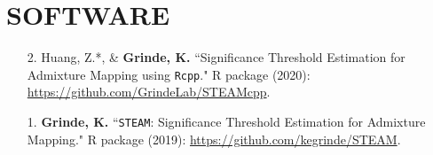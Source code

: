 \documentclass[margin]{res}
\begin{document}
\begin{resume}
\begin{itemize}
\end{itemize}


\section{SOFTWARE} 

\begin{itemize}
\item[2.] Huang, Z.*, \& \textbf{Grinde, K.} ``Significance Threshold Estimation for Admixture Mapping using \texttt{Rcpp}." R package (2020): \href{https://github.com/GrindeLab/STEAMcpp}{https://github.com/GrindeLab/STEAMcpp}.

\item[1.] \textbf{Grinde, K.} ``\texttt{STEAM}: Significance Threshold Estimation for Admixture Mapping." R package (2019): \href{https://github.com/kegrinde/STEAM}{https://github.com/kegrinde/STEAM}.\\
	

\end{itemize}
\end{resume}
\end{document}
